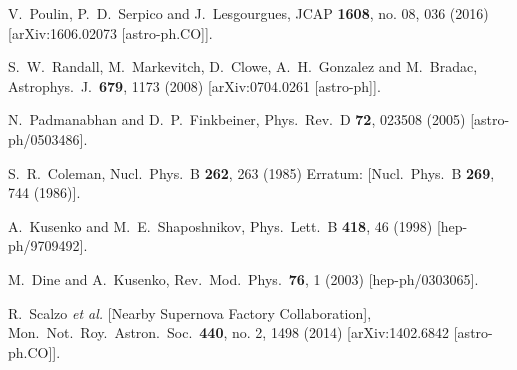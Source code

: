 \documentclass[preprintnumbers,amsmath,amssymb,prd, superscriptaddress,twocolumn]{revtex4}
\begin{document}
\begin{thebibliography}{99}
  V.~Poulin, P.~D.~Serpico and J.~Lesgourgues,
  JCAP {\bf 1608}, no. 08, 036 (2016)
  [arXiv:1606.02073 [astro-ph.CO]].


  S.~W.~Randall, M.~Markevitch, D.~Clowe, A.~H.~Gonzalez and M.~Bradac,
  Astrophys.\ J.\  {\bf 679}, 1173 (2008)
  [arXiv:0704.0261 [astro-ph]].


  N.~Padmanabhan and D.~P.~Finkbeiner,
  Phys.\ Rev.\ D {\bf 72}, 023508 (2005)
  [astro-ph/0503486].


  S.~R.~Coleman,
  Nucl.\ Phys.\ B {\bf 262}, 263 (1985)
  Erratum: [Nucl.\ Phys.\ B {\bf 269}, 744 (1986)].


  A.~Kusenko and M.~E.~Shaposhnikov,
  Phys.\ Lett.\ B {\bf 418}, 46 (1998)
  [hep-ph/9709492].


  M.~Dine and A.~Kusenko,
  Rev.\ Mod.\ Phys.\  {\bf 76}, 1 (2003)
  [hep-ph/0303065].


  R.~Scalzo {\it et al.} [Nearby Supernova Factory Collaboration],
  Mon.\ Not.\ Roy.\ Astron.\ Soc.\  {\bf 440}, no. 2, 1498 (2014)
  [arXiv:1402.6842 [astro-ph.CO]].



\end{thebibliography}
\end{document}
